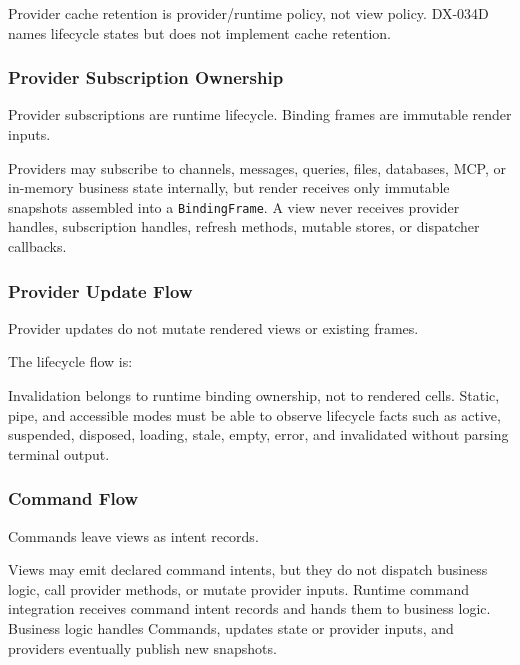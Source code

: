 Provider cache retention is provider/runtime policy, not view policy. DX-034D names lifecycle states but does not implement cache retention.

\subsubsection{Provider Subscription Ownership}\label{record-132-provider-subscription-ownership}

Provider subscriptions are runtime lifecycle. Binding frames are immutable render inputs.

Providers may subscribe to channels, messages, queries, files, databases, MCP, or in-memory business state internally, but render receives only immutable snapshots assembled into a \texttt{B\allowbreak{}i\allowbreak{}n\allowbreak{}d\allowbreak{}i\allowbreak{}n\allowbreak{}g\allowbreak{}F\allowbreak{}r\allowbreak{}a\allowbreak{}m\allowbreak{}e}. A view never receives provider handles, subscription handles, refresh methods, mutable stores, or dispatcher callbacks.

\subsubsection{Provider Update Flow}\label{record-132-provider-update-flow}

Provider updates do not mutate rendered views or existing frames.

The lifecycle flow is:



Invalidation belongs to runtime binding ownership, not to rendered cells. Static, pipe, and accessible modes must be able to observe lifecycle facts such as active, suspended, disposed, loading, stale, empty, error, and invalidated without parsing terminal output.

\subsubsection{Command Flow}\label{record-132-command-flow}

Commands leave views as intent records.

Views may emit declared command intents, but they do not dispatch business logic, call provider methods, or mutate provider inputs. Runtime command integration receives command intent records and hands them to business logic. Business logic handles Commands, updates state or provider inputs, and providers eventually publish new snapshots.

